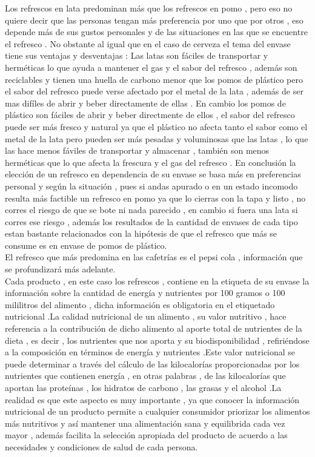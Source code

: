 \documentclass[twocolumn,12pt]{article}
\begin{document}
Los refrescos en lata predominan más que los refrescos en pomo , pero eso no quiere decir que las personas tengan más preferencia por uno que por otros , eso depende más de sus gustos personales y de las situaciones en las que se encuentre el refresco .
No obstante al igual que en el caso de cerveza el tema del envase tiene sus ventajas y desventajas :
Las latas son fáciles de transportar y herméticas lo que ayuda a mantener el gas y el sabor del refresco , además son reciclables y tienen una huella de carbono menor que los pomos de plástico pero el sabor del refresco puede verse afectado por el metal de la lata , además de ser mas difíles de abrir y beber directamente de ellas .
En cambio los pomos de plástico son fáciles de abrir y beber directmente de ellos , el sabor del refresco puede ser más fresco y natural ya que el plástico no afecta tanto el sabor como el metal de la lata pero pueden ser más pesadas y voluminosas que las latas , lo que las hace menos fáviles de transportar y almacenar , también son menos herméticas que lo que afecta la frescura y el gas del refresco .
En conclusión la elección de un refresco en dependencia de su envase se basa más en preferencias personal y según la situación , pues si andas apurado o en un estado incomodo resulta más factible un refresco en pomo ya que lo cierras con la tapa y listo , no corres el riesgo de que se bote ni nada parecido , en cambio si fuera una lata si corres ese riesgo , además los resultados de la cantidad de envases de cada tipo estan bastante relacionados con la hipótesis de que el refresco que más se consume es en envase de pomos de plástico.\\

El refresco que más predomina en las cafetrías es el pepsi cola , información que se profundizará más adelante.\\


Cada producto , en este caso los refrescos , contiene en la etiqueta de su envase la información sobre la cantidad de energía y nutrientes por 100  gramos o 100 mililitros del alimento , dicha información es obligatoria en el etiquetado nutricional .La calidad nutricional de un alimento , su valor nutritivo , hace referencia a la contribución de dicho alimento al aporte total de nutrientes de la dieta , es decir , los nutrientes que nos aporta y su biodisponibilidad , refiriéndose a la composición en términos de energía y nutrientes .Este valor nutricional se puede determinar a través del cálculo de las kilocalorías proporcionadas por los nutrientes que contienen energía , en otras palabras , de las kilocalorías que aportan las proteínas , los hidratos de carbono , las grasas y el alcohol .La realidad es que este aspecto es muy importante , ya que conocer la información nutricional de un producto permite a cualquier consumidor priorizar los alimentos más nutritivos y así mantener una alimentación sana y equilibrida cada vez mayor , además facilita la selección apropiada del producto de acuerdo a las necesidades y condiciones de salud de cada persona.\\
\end{document}
